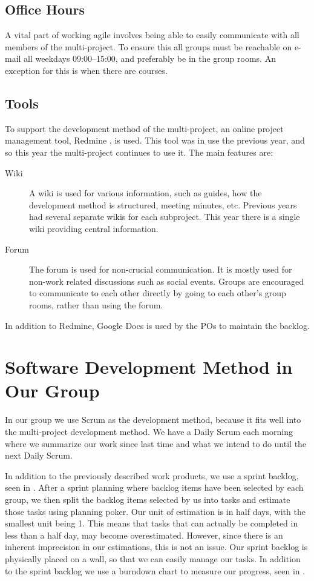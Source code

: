 \subsection{Office Hours}
A vital part of working agile involves being able to easily communicate with all members of the multi-project. To ensure this all groups must be reachable on e-mail all weekdays 09:00--15:00, and preferably be in the group rooms. An exception for this is when there are courses.

\subsection{Tools}\label{sec:tools}
To support the development method of the multi-project, an online project management tool, Redmine \parencite{redmine-website}, is used. This tool was in use the previous year, and so this year the multi-project continues to use it. The main features are:

\begin{description}
  \item[Wiki] A wiki is used for various information, such as guides, how the development method is structured, meeting minutes, etc. Previous years had several separate wikis for each subproject. This year there is a single wiki providing central information.
  \item[Forum] The forum is used for non-crucial communication. It is mostly used for non-work related discussions such as social events. Groups are encouraged to communicate to each other directly by going to each other's group rooms, rather than using the forum.
\end{description}

In addition to Redmine, Google Docs is used by the POs to maintain the backlog.

\section{Software Development Method in Our Group}\label{sec:swmethod_ourgroup}
In our group we use Scrum as the development method, because it fits well into the multi-project development method. We have a Daily Scrum each morning where we summarize our work since last time and what we intend to do until the next Daily Scrum.

In addition to the previously described work products, we use a sprint backlog, seen in . After a sprint planning where backlog items have been selected by each group, we then split the backlog items selected by us into tasks and estimate those tasks using planning poker. Our unit of estimation is in half days, with the smallest unit being 1. This means that tasks that can actually be completed in less than a half day, may become overestimated. However, since there is an inherent imprecision in our estimations, this is not an issue. Our sprint backlog is physically placed on a wall, so that we can easily manage our tasks. In addition to the sprint backlog we use a burndown chart to measure our progress, seen in . 

